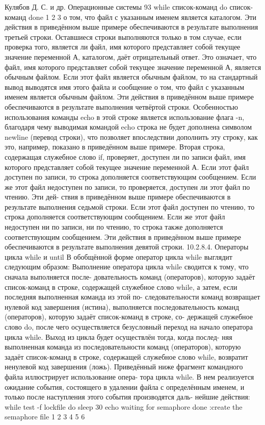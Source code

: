 \documentclass[
  letterpaper,
  DIV=11,
  numbers=noendperiod]{scrartcl}
\begin{document}
Кулябов Д. С. и др. Операционные системы 93 while список-команд do
список-команд done 1 2 3 о том, что файл с указанным именем является
каталогом. Эти действия в приведённом выше примере обеспечиваются в
результате выполнения третьей строки. Оставшиеся строки выполняются
только в том случае, если проверка того, является ли файл, имя которого
представляет собой текущее значение переменной А, каталогом, даёт
отрицательный ответ. Это означает, что файл, имя которого представляет
собой текущее значение переменной А, является обычным файлом. Если этот
файл является обычным файлом, то на стандартный вывод выводятся имя
этого файла и сообщение о том, что файл с указанным именем является
обычным файлом. Эти действия в приведённом выше примере обеспечиваются в
результате выполнения четвёртой строки. Особенностью использования
команды echo в этой строке является использование флага -n, благодаря
чему выводимая командой echo строка не будет дополнена символом newline
(перевод строки), что позволяет впоследствии дополнить эту строку, как
это, например, показано в приведённом выше примере. Вторая строка,
содержащая служебное слово if, проверяет, доступен ли по записи файл,
имя которого представляет собой текущее значение переменной А. Если этот
файл доступен по записи, то строка дополняется соответствующим
сообщением. Если же этот файл недоступен по записи, то проверяется,
доступен ли этот файл по чтению. Эти дей- ствия в приведённом выше
примере обеспечиваются в результате выполнения седьмой строки. Если этот
файл доступен по чтению, то строка дополняется соответствующим
сообщением. Если же этот файл недоступен ни по записи, ни по чтению, то
строка также дополняется соответствующим сообщением. Эти действия в
приведённом выше примере обеспечиваются в результате выполнения девятой
строки. 10.2.8.4. Операторы цикла while и until В обобщённой форме
оператор цикла while выглядит следующим образом: Выполнение оператора
цикла while сводится к тому, что сначала выполняется после-
довательность команд (операторов), которую задаёт список-команд в
строке, содержащей служебное слово while, а затем, если последняя
выполненная команда из этой по- следовательности команд возвращает
нулевой код завершения (истина), выполняется последовательность команд
(операторов), которую задаёт список-команд в строке, со- держащей
служебное слово do, после чего осуществляется безусловный переход на
начало оператора цикла while. Выход из цикла будет осуществлён тогда,
когда послед- няя выполненная команда из последовательности команд
(операторов), которую задаёт список-команд в строке, содержащей
служебное слово while, возвратит ненулевой код завершения (ложь).
Приведённый ниже фрагмент командного файла иллюстрирует использование
опера- тора цикла while. В нем реализуется ожидание события, состоящего
в удалении файла с определённым именем, и только после наступления этого
события производятся даль- нейшие действия: while test -f lockfile do
sleep 30 echo waiting for semaphore done :create the semaphore file 1 2
3 4 5 6
\end{document}
